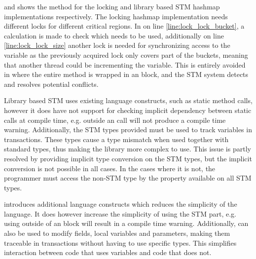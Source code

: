  and  shows the  method for the locking and library based \ac{STM} hashmap implementations respectively. The locking hashmap implementation needs different locks for different critical regions. In  on line \ref{line:lock_lock_bucket}, a calculation is made to check which needs to be used, additionally on line \ref{line:lock_lock_size} another lock is needed for synchronizing access to the  variable as the previously acquired lock only covers part of the buckets, meaning that another thread could be incrementing the  variable. This is entirely avoided in  where the entire method is wrapped in an  block, and the \ac{STM} system detects and resolves potential conflicts.

Library based \ac{STM} uses existing language constructs, such as static method calls, however it does have not support for checking implicit dependency between static calls at compile time, e.g.  outside an  call will not produce a compile time warning. Additionally, the \ac{STM} types provided must be used to track variables in transactions. These types cause a type mismatch when used together with standard types, thus making the library more complex to use. This issue is partly resolved by providing implicit type conversion on the \ac{STM} types, but the implicit conversion is not possible in all cases. In the cases where it is not, the programmer must access the non-\ac{STM} type by the  property available on all \ac{STM} types. 

\stmnamesp introduces additional language constructs which reduces the simplicity of the language. It does however increase the simplicity of using the \ac{STM} part, e.g. using  outside of an  block will result in a compile time warning. Additionally,  can also be used to modify fields, local variables and parameters, making them traceable in transactions without having to use specific types. This simplifies interaction between code that uses  variables and code that does not. 

